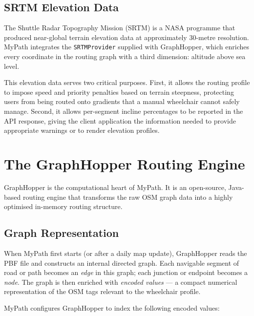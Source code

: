\documentclass[12pt, a4paper]{report}
\begin{document}
\subsection{SRTM Elevation Data}
\label{subsec:srtm}

The Shuttle Radar Topography Mission (SRTM) is a NASA programme that produced near-global terrain elevation data at approximately 30-metre resolution. MyPath integrates the \texttt{SRTMProvider} supplied with GraphHopper, which enriches every coordinate in the routing graph with a third dimension: altitude above sea level.

This elevation data serves two critical purposes. First, it allows the routing profile to impose speed and priority penalties based on terrain steepness, protecting users from being routed onto gradients that a manual wheelchair cannot safely manage. Second, it allows per-segment incline percentages to be reported in the API response, giving the client application the information needed to provide appropriate warnings or to render elevation profiles.

\section{The GraphHopper Routing Engine}
\label{sec:graphhopper}

GraphHopper is the computational heart of MyPath. It is an open-source, Java-based routing engine that transforms the raw OSM graph data into a highly optimised in-memory routing structure.

\subsection{Graph Representation}
\label{subsec:graph}

When MyPath first starts (or after a daily map update), GraphHopper reads the PBF file and constructs an internal directed graph. Each navigable segment of road or path becomes an \emph{edge} in this graph; each junction or endpoint becomes a \emph{node}. The graph is then enriched with \emph{encoded values} — a compact numerical representation of the OSM tags relevant to the wheelchair profile.

MyPath configures GraphHopper to index the following encoded values:

\begin{center}
\end{center}
\end{document}
